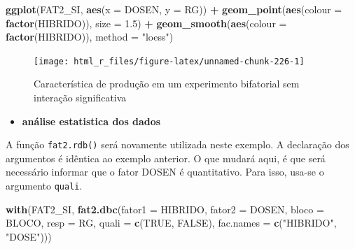 \documentclass[
]{book}
\newenvironment{Shaded}{\begin{snugshade}}{\end{snugshade}}
\newcommand{\DataTypeTok}[1]{\textcolor[rgb]{0.13,0.29,0.53}{#1}}
\newcommand{\FloatTok}[1]{\textcolor[rgb]{0.00,0.00,0.81}{#1}}
\newcommand{\KeywordTok}[1]{\textcolor[rgb]{0.13,0.29,0.53}{\textbf{#1}}}
\newcommand{\NormalTok}[1]{#1}
\newcommand{\OperatorTok}[1]{\textcolor[rgb]{0.81,0.36,0.00}{\textbf{#1}}}
\newcommand{\OtherTok}[1]{\textcolor[rgb]{0.56,0.35,0.01}{#1}}
\newcommand{\StringTok}[1]{\textcolor[rgb]{0.31,0.60,0.02}{#1}}
\providecommand{\tightlist}{%
  \setlength{\itemsep}{0pt}\setlength{\parskip}{0pt}}
\begin{document}
\begin{Shaded}
\begin{Highlighting}[]
\KeywordTok{ggplot}\NormalTok{(FAT2_SI, }\KeywordTok{aes}\NormalTok{(}\DataTypeTok{x =}\NormalTok{ DOSEN, }\DataTypeTok{y =}\NormalTok{ RG)) }\OperatorTok{+}
\StringTok{       }\KeywordTok{geom_point}\NormalTok{(}\KeywordTok{aes}\NormalTok{(}\DataTypeTok{colour =} \KeywordTok{factor}\NormalTok{(HIBRIDO)), }\DataTypeTok{size =} \FloatTok{1.5}\NormalTok{) }\OperatorTok{+}
\StringTok{       }\KeywordTok{geom_smooth}\NormalTok{(}\KeywordTok{aes}\NormalTok{(}\DataTypeTok{colour =} \KeywordTok{factor}\NormalTok{(HIBRIDO)), }\DataTypeTok{method =} \StringTok{"loess"}\NormalTok{)}
\end{Highlighting}
\end{Shaded}

\begin{figure}

{\centering \texttt{[image: html\_r\_files/figure-latex/unnamed-chunk-226-1]} 

}

\caption{Característica de produção em um experimento bifatorial sem interação significativa}\label{fig:unnamed-chunk-226}
\end{figure}


\begin{itemize}
\tightlist
\item
  \textbf{análise estatistica dos dados}
\end{itemize}

A função \texttt{fat2.rdb()}  será novamente utilizada neste exemplo. A declaração dos argumentos é idêntica ao exemplo anterior. O que mudará aqui, é que será necessário informar que o fator DOSEN é quantitativo. Para isso, usa-se o argumento \texttt{quali}.

\begin{Shaded}
\begin{Highlighting}[]
\KeywordTok{with}\NormalTok{(FAT2_SI, }
     \KeywordTok{fat2.dbc}\NormalTok{(}\DataTypeTok{fator1 =}\NormalTok{  HIBRIDO,}
              \DataTypeTok{fator2 =}\NormalTok{  DOSEN,}
              \DataTypeTok{bloco =}\NormalTok{ BLOCO,}
              \DataTypeTok{resp =}\NormalTok{  RG,}
              \DataTypeTok{quali =} \KeywordTok{c}\NormalTok{(}\OtherTok{TRUE}\NormalTok{, }\OtherTok{FALSE}\NormalTok{),}
              \DataTypeTok{fac.names =} \KeywordTok{c}\NormalTok{(}\StringTok{"HIBRIDO"}\NormalTok{, }\StringTok{"DOSE"}\NormalTok{)))}
\end{Highlighting}
\end{Shaded}
\end{document}
